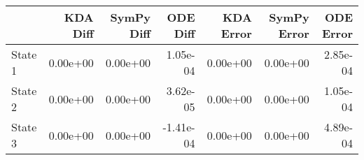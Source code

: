 \begin{tabular}{lrrrrrr}
\toprule
{} &  KDA Diff &  SymPy Diff &  ODE Diff &  KDA Error &  SymPy Error &  ODE Error \\
\midrule
State 1 &  0.00e+00 &    0.00e+00 &  1.05e-04 &   0.00e+00 &     0.00e+00 &   2.85e-04 \\
State 2 &  0.00e+00 &    0.00e+00 &  3.62e-05 &   0.00e+00 &     0.00e+00 &   1.05e-04 \\
State 3 &  0.00e+00 &    0.00e+00 & -1.41e-04 &   0.00e+00 &     0.00e+00 &   4.89e-04 \\
\bottomrule
\end{tabular}
